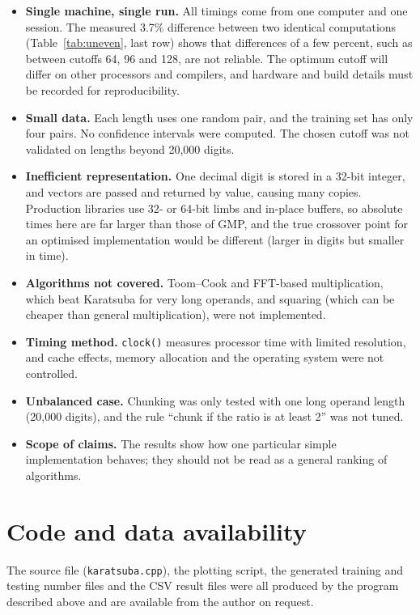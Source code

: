 \documentclass[11pt,a4paper]{article}
\begin{document}
\begin{itemize}
  \item \textbf{Single machine, single run.} All timings come from one computer and one session. The measured 3.7\% difference between two identical computations (Table~\ref{tab:uneven}, last row) shows that differences of a few percent, such as between cutoffs 64, 96 and 128, are not reliable. The optimum cutoff will differ on other processors and compilers, and hardware and build details must be recorded for reproducibility.
  \item \textbf{Small data.} Each length uses one random pair, and the training set has only four pairs. No confidence intervals were computed. The chosen cutoff was not validated on lengths beyond 20{,}000 digits.
  \item \textbf{Inefficient representation.} One decimal digit is stored in a 32-bit integer, and vectors are passed and returned by value, causing many copies. Production libraries use 32- or 64-bit limbs and in-place buffers, so absolute times here are far larger than those of GMP, and the true crossover point for an optimised implementation would be different (larger in digits but smaller in time).
  \item \textbf{Algorithms not covered.} Toom--Cook and FFT-based multiplication, which beat Karatsuba for very long operands, and squaring (which can be cheaper than general multiplication), were not implemented.
  \item \textbf{Timing method.} \texttt{clock()} measures processor time with limited resolution, and cache effects, memory allocation and the operating system were not controlled.
  \item \textbf{Unbalanced case.} Chunking was only tested with one long operand length (20{,}000 digits), and the rule ``chunk if the ratio is at least 2'' was not tuned.
  \item \textbf{Scope of claims.} The results show how one particular simple implementation behaves; they should not be read as a general ranking of algorithms.
\end{itemize}

\section*{Code and data availability}
The source file (\texttt{karatsuba.cpp}), the plotting script, the generated training and testing number files and the CSV result files were all produced by the program described above and are available from the author on request.
\end{document}

